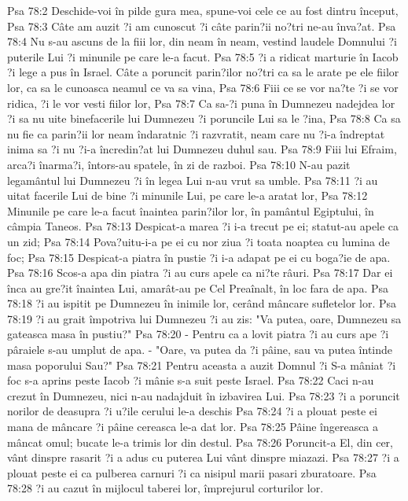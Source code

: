 Psa 78:2  Deschide-voi în pilde gura mea, spune-voi cele ce au fost dintru început,
Psa 78:3  Câte am auzit ?i am cunoscut ?i câte parin?ii no?tri ne-au înva?at.
Psa 78:4  Nu s-au ascuns de la fiii lor, din neam în neam, vestind laudele Domnului ?i puterile Lui ?i minunile pe care le-a facut.
Psa 78:5  ?i a ridicat marturie în Iacob ?i lege a pus în Israel. Câte a poruncit parin?ilor no?tri ca sa le arate pe ele fiilor lor, ca sa le cunoasca neamul ce va sa vina,
Psa 78:6  Fiii ce se vor na?te ?i se vor ridica, ?i le vor vesti fiilor lor,
Psa 78:7  Ca sa-?i puna în Dumnezeu nadejdea lor ?i sa nu uite binefacerile lui Dumnezeu ?i poruncile Lui sa le ?ina,
Psa 78:8  Ca sa nu fie ca parin?ii lor neam îndaratnic ?i razvratit, neam care nu ?i-a îndreptat inima sa ?i nu ?i-a încredin?at lui Dumnezeu duhul sau.
Psa 78:9  Fiii lui Efraim, arca?i înarma?i, întors-au spatele, în zi de razboi.
Psa 78:10  N-au pazit legamântul lui Dumnezeu ?i în legea Lui n-au vrut sa umble.
Psa 78:11  ?i au uitat facerile Lui de bine ?i minunile Lui, pe care le-a aratat lor,
Psa 78:12  Minunile pe care le-a facut înaintea parin?ilor lor, în pamântul Egiptului, în câmpia Taneos.
Psa 78:13  Despicat-a marea ?i i-a trecut pe ei; statut-au apele ca un zid;
Psa 78:14  Pova?uitu-i-a pe ei cu nor ziua ?i toata noaptea cu lumina de foc;
Psa 78:15  Despicat-a piatra în pustie ?i i-a adapat pe ei cu boga?ie de apa.
Psa 78:16  Scos-a apa din piatra ?i au curs apele ca ni?te râuri.
Psa 78:17  Dar ei înca au gre?it înaintea Lui, amarât-au pe Cel Preaînalt, în loc fara de apa.
Psa 78:18  ?i au ispitit pe Dumnezeu în inimile lor, cerând mâncare sufletelor lor.
Psa 78:19  ?i au grait împotriva lui Dumnezeu ?i au zis: "Va putea, oare, Dumnezeu sa gateasca masa în pustiu?"
Psa 78:20  - Pentru ca a lovit piatra ?i au curs ape ?i pâraiele s-au umplut de apa. - "Oare, va putea da ?i pâine, sau va putea întinde masa poporului Sau?"
Psa 78:21  Pentru aceasta a auzit Domnul ?i S-a mâniat ?i foc s-a aprins peste Iacob ?i mânie s-a suit peste Israel.
Psa 78:22  Caci n-au crezut în Dumnezeu, nici n-au nadajduit în izbavirea Lui.
Psa 78:23  ?i a poruncit norilor de deasupra ?i u?ile cerului le-a deschis
Psa 78:24  ?i a plouat peste ei mana de mâncare ?i pâine cereasca le-a dat lor.
Psa 78:25  Pâine îngereasca a mâncat omul; bucate le-a trimis lor din destul.
Psa 78:26  Poruncit-a El, din cer, vânt dinspre rasarit ?i a adus cu puterea Lui vânt dinspre miazazi.
Psa 78:27  ?i a plouat peste ei ca pulberea carnuri ?i ca nisipul marii pasari zburatoare.
Psa 78:28  ?i au cazut în mijlocul taberei lor, împrejurul corturilor lor.
